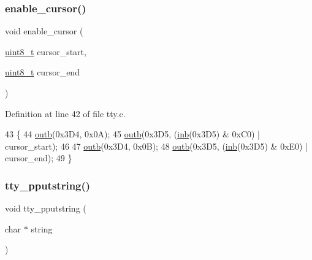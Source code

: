 \subsubsection{\texorpdfstring{enable\+\_\+cursor()}{enable\_cursor()}}
{\footnotesize\ttfamily void enable\+\_\+cursor (\begin{DoxyParamCaption}\item[{\hyperlink{a00116_aba7bc1797add20fe3efdf37ced1182c5_aba7bc1797add20fe3efdf37ced1182c5}{uint8\+\_\+t}}]{cursor\+\_\+start,  }\item[{\hyperlink{a00116_aba7bc1797add20fe3efdf37ced1182c5_aba7bc1797add20fe3efdf37ced1182c5}{uint8\+\_\+t}}]{cursor\+\_\+end }\end{DoxyParamCaption})}



Definition at line 42 of file tty.\+c.


\begin{DoxyCode}
43 \{
44     \hyperlink{a00131_aa37f5841c54156a4b14fc0d6f626b44f_aa37f5841c54156a4b14fc0d6f626b44f}{outb}(0x3D4, 0x0A);
45     \hyperlink{a00131_aa37f5841c54156a4b14fc0d6f626b44f_aa37f5841c54156a4b14fc0d6f626b44f}{outb}(0x3D5, (\hyperlink{a00131_a0223c8898dfec29069879dc51076e28a_a0223c8898dfec29069879dc51076e28a}{inb}(0x3D5) & 0xC0) | cursor\_start);
46  
47     \hyperlink{a00131_aa37f5841c54156a4b14fc0d6f626b44f_aa37f5841c54156a4b14fc0d6f626b44f}{outb}(0x3D4, 0x0B);
48     \hyperlink{a00131_aa37f5841c54156a4b14fc0d6f626b44f_aa37f5841c54156a4b14fc0d6f626b44f}{outb}(0x3D5, (\hyperlink{a00131_a0223c8898dfec29069879dc51076e28a_a0223c8898dfec29069879dc51076e28a}{inb}(0x3D5) & 0xE0) | cursor\_end);
49 \}
\end{DoxyCode}
\mbox{\label{a00140_ade960b1320324706aac6c00cc6b1b2fe_ade960b1320324706aac6c00cc6b1b2fe}} 
\subsubsection{\texorpdfstring{tty\+\_\+pputstring()}{tty\_pputstring()}}
{\footnotesize\ttfamily void tty\+\_\+pputstring (\begin{DoxyParamCaption}\item[{char $\ast$}]{string }\end{DoxyParamCaption})}



